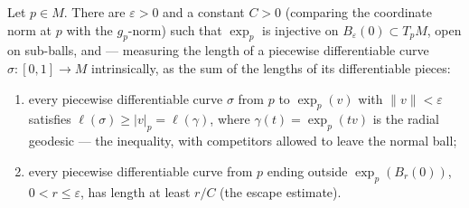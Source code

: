 \begin{lemma}
  \label{lem:dc-ch3-3-6-competitor}


  Let $p\in M$. There are $\varepsilon>0$ and a constant $C>0$ (comparing the
  coordinate norm at $p$ with the $g_p$-norm) such that $\exp_p$ is injective
  on $B_\varepsilon(0)\subset T_pM$, open on sub-balls, and — measuring the
  length of a piecewise differentiable curve $\sigma:[0,1]\to M$
  intrinsically, as the sum of the lengths of its differentiable pieces:
  \begin{enumerate}
  \item every piecewise differentiable curve $\sigma$ from $p$ to
    $\exp_p(v)$ with $\|v\|<\varepsilon$ satisfies
    $\ell(\sigma)\ge|v|_p=\ell(\gamma)$, where $\gamma(t)=\exp_p(tv)$ is the
    radial geodesic — the inequality, with competitors allowed to
    leave the normal ball;
  \item every piecewise differentiable curve from $p$ ending outside
    $\exp_p(B_r(0))$, $0<r\le\varepsilon$, has length at least $r/C$ (the
    escape estimate).
  \end{enumerate}
\end{lemma}
